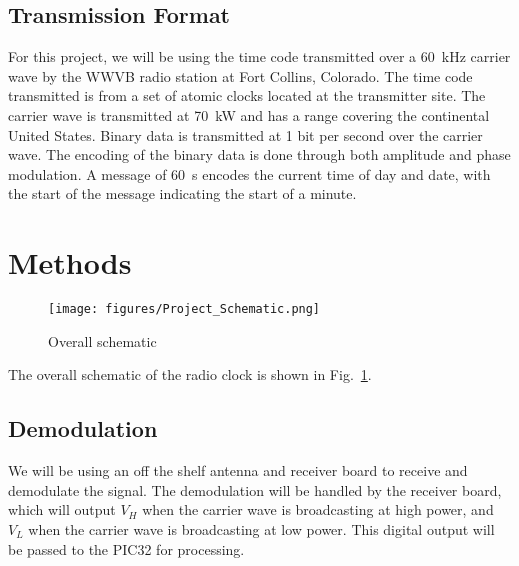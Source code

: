 \documentclass[11pt]{article}
\begin{document}
\subsection{Transmission Format}
For this project, we will be using the time code transmitted over a \SI{60}{\kilo \Hz}
carrier wave by the WWVB radio station at Fort Collins, Colorado. The time code
transmitted is from a set of atomic clocks located at the transmitter site. The carrier
wave is transmitted at \SI{70}{\kilo \watt} and has a range covering the continental
United States. Binary data is transmitted at 1 bit per second over the carrier wave. The
encoding of the binary data is done through both amplitude and phase modulation. A message
of \SI{60}{\second} encodes the current time of day and date, with the start of the
message indicating the start of a minute.

\section{Methods}

\begin{figure}[h]
  \centering
  \texttt{[image: figures/Project\_Schematic.png]}
  \caption{Overall schematic}
  \label{fig:scheme}
\end{figure}

\noindent The overall schematic of the radio clock is shown in Fig.~\ref{fig:scheme}.

\subsection{Demodulation}
We will be using an off the shelf antenna and receiver board to receive and demodulate the
signal. The demodulation will be handled by the receiver board, which will output $V_H$
when the carrier wave is broadcasting at high power, and $V_L$ when the carrier wave is
broadcasting at low power. This digital output will be passed to the PIC32 for processing.
\end{document}
